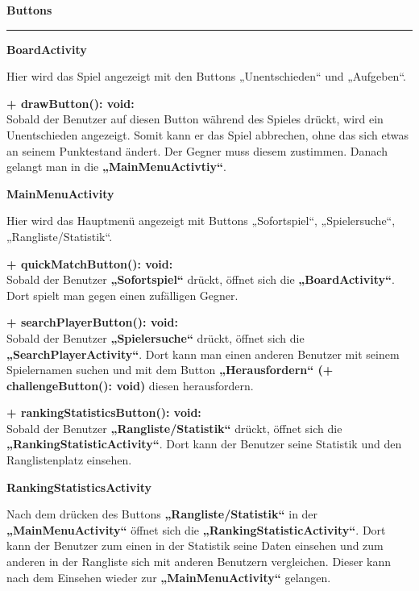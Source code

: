 \documentclass[parskip=full]{scrartcl}
\begin{document}
				\textbf{\large{Buttons}}
				\newline
				\rule{\textwidth}{1pt}
				\begin{description}		
				\item \textbf{\Large{BoardActivity}} 
					 
					 Hier wird das Spiel angezeigt mit den Buttons „Unentschieden“ und „Aufgeben“.
					 
					 \item \textbf{+ drawButton(): void:}\\ Sobald der Benutzer auf diesen Button während des Spieles drückt, wird ein Unentschieden angezeigt. Somit kann er das Spiel abbrechen, ohne das sich etwas an seinem Punktestand ändert. Der Gegner muss diesem zustimmen. Danach gelangt man in die \textbf {„MainMenuActivtiy“}. \\
		
					 
			  \item \textbf{\Large{MainMenuActivity}} 
					 
					 Hier wird das Hauptmenü angezeigt mit Buttons „Sofortspiel“, „Spielersuche“, „Rangliste/Statistik“.
					
					\item \textbf{+ quickMatchButton(): void:}\\ Sobald der Benutzer \textbf {„Sofortspiel“} drückt, öffnet sich die \textbf {„BoardActivity“}. Dort spielt man gegen einen zufälligen Gegner.
					
					\item \textbf{+ searchPlayerButton(): void:}\\ Sobald der Benutzer \textbf {„Spielersuche“} drückt, öffnet sich die \textbf {„SearchPlayerActivity“}. Dort kann man einen anderen Benutzer mit seinem Spielernamen suchen und mit dem Button  \textbf {„Herausfordern“ (+ challengeButton(): void) } diesen herausfordern. 
					
					\item \textbf{+ rankingStatisticsButton(): void:}\\ Sobald der Benutzer \textbf {„Rangliste/Statistik“} drückt, öffnet sich die \textbf {„RankingStatisticActivity“}. 
					Dort kann der Benutzer seine Statistik und den Ranglistenplatz einsehen. \\

					 \item \textbf{\Large{RankingStatisticsActivity}} 
					 
					 Nach dem drücken des Buttons \textbf {„Rangliste/Statistik“} in der \textbf {„MainMenuActivity“} öffnet sich  die \textbf {„RankingStatisticActivity“}. Dort kann der Benutzer zum einen in der Statistik seine Daten einsehen und zum anderen in der Rangliste sich mit anderen Benutzern vergleichen. Dieser kann nach dem Einsehen wieder zur \textbf { „MainMenuActivity“} gelangen. \\
					 

\end{description}
\end{document}
